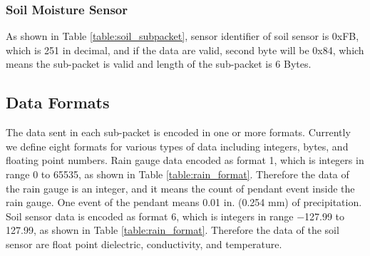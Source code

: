\subsubsection{Soil Moisture Sensor}
As shown in Table \ref{table:soil_subpacket}, sensor identifier of soil sensor is 0xFB, which is 251 in decimal,
and if the data are valid, second byte will be 0x84, which means the sub-packet is valid and length of the sub-packet is
6 Bytes.


\begin{table}[H]
    \caption{Sub-packet for rain gauge}
    \label{table:soil_subpacket}
\end{table}


\subsection{Data Formats}

The data sent in each sub-packet is encoded in one or more formats. Currently we define eight formats for various types of data including integers, bytes, and floating point numbers. 
Rain gauge data encoded as format 1, which is integers in range 0 to 65535, as shown in Table \ref{table:rain_format}.
Therefore the data of the rain gauge is an integer, and it means the count of pendant event inside the rain gauge. One event of the pendant means 0.01 in. (0.254 mm) of precipitation.
Soil sensor data is encoded as format 6, which is integers in range $-$127.99 to 127.99, as shown in Table \ref{table:rain_format}.
Therefore the data of the soil sensor are float point dielectric, conductivity, and temperature.
\\


